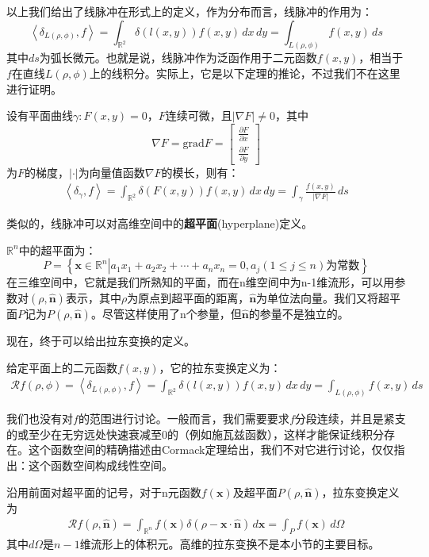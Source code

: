 \documentclass{ctexbook}
\begin{document}
以上我们给出了线脉冲在形式上的定义，作为分布而言，线脉冲的作用为：
\[\left\langle \delta_{L(\rho,\phi)},f\right\rangle=\int_{\mathbb{R}^2}\delta(l(x,y))f(x,y)\,dx\,dy=\int_{L(\rho,\phi)}f(x,y)\,ds\]
其中$ds$为弧长微元。也就是说，线脉冲作为泛函作用于二元函数$f(x,y)$，相当于$f$在直线$L(\rho,\phi)$上的线积分。实际上，它是以下定理的推论，不过我们不在这里进行证明。
\begin{claim}
    设有平面曲线$\gamma:F(x,y)=0$，$F$连续可微，且$|\nabla F|\neq 0$，其中
    \[\nabla F=\text{grad}F=\begin{bmatrix}
        \frac{\partial F}{\partial x}\\
        \frac{\partial F}{\partial y}        
    \end{bmatrix}\]
    为$F$的梯度，$|\cdot|$为向量值函数$\nabla F$的模长，则有：
    \begin{align*}
        \left\langle \delta_{\gamma},f\right\rangle=\int_{\mathbb{R}^2}\delta(F(x,y))f(x,y)\,dx\,dy=\int_{\gamma}\frac{f(x,y)}{|\nabla F|}\,ds
    \end{align*}
\end{claim}

类似的，线脉冲可以对高维空间中的\textbf{超平面}(hyperplane)定义。
\begin{definition}
$\mathbb{R}^n$中的超平面为：
\[P=\left\{\mathbf{x}\in\mathbb{R}^n\left|a_1 x_1+a_2 x_2+\cdots+a_n x_n=0,a_j(1\leq j\leq n)\text{为常数}\right.\right\}\]
在三维空间中，它就是我们所熟知的平面，而在n维空间中为n-1维流形，可以用参数对$(\rho,\hat{\mathbf{n}})$表示，其中$\rho$为原点到超平面的距离，$\hat{\mathbf{n}}$为单位法向量。我们又将超平面$P$记为$P(\rho,\hat{\mathbf{n}})$。尽管这样使用了n个参量，但$\hat{\mathbf{n}}$的参量不是独立的。
\end{definition}

现在，终于可以给出拉东变换的定义。
\begin{definition}[拉东变换]
    给定平面上的二元函数$f(x,y)$，它的拉东变换定义为：
    \begin{align*}
    \mathcal{R} f(\rho,\phi)=\left\langle \delta_{L(\rho,\phi)},f\right\rangle=\int_{\mathbb{R}^2}\delta(l(x,y))f(x,y)\,dx\,dy=\int_{L(\rho,\phi)}f(x,y)\,ds
    \end{align*}
\end{definition}
\begin{remark}
    我们也没有对$f$的范围进行讨论。一般而言，我们需要要求$f$分段连续，并且是紧支的或至少在无穷远处快速衰减至0的（例如施瓦兹函数），这样才能保证线积分存在。这个函数空间的精确描述由Cormack定理给出，我们不对它进行讨论，仅仅指出：这个函数空间构成线性空间。
\end{remark}
\begin{remark}
    沿用前面对超平面的记号，对于n元函数$f(\mathbf{x})$及超平面$P(\rho,\hat{\mathbf{n}})$，拉东变换定义为
    \begin{align*}
    \mathcal{R} f(\rho,\hat{\mathbf{n}})=\int_{\mathbb{R}^n}f(\mathbf{x})\delta(\rho-\mathbf{x}\cdot\hat{\mathbf{n}})\,d\mathbf{x}=\int_{P}f(\mathbf{x})\,d\Omega
    \end{align*}
    其中$d\Omega$是$n-1$维流形上的体积元。高维的拉东变换不是本小节的主要目标。
\end{remark}
\end{document}
